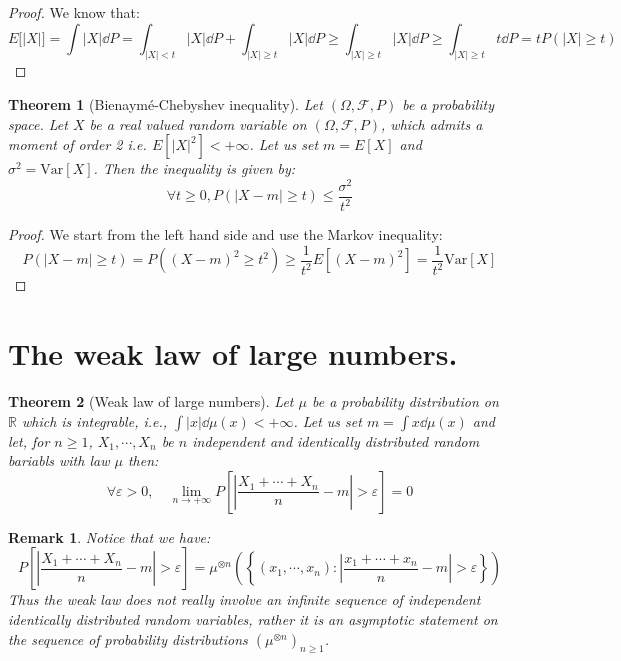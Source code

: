 \documentclass[10pt,a4paper]{book}
\newtheorem{theorem}{Theorem}[section]
\newtheorem*{remark}{Remark}
\theoremstyle{definition}
\begin{document}
\begin{proof}

We know that:
\[
E\big[|X|\big] = \int |X| \dd P = \int_{|X| < t} |X| \dd P + \int_{|X| \geq t} |X| \dd P \geq \int_{|X| \geq t} |X| \dd P \geq \int_{|X| \geq t} t \dd P = t P(|X| \geq t)
\]

\end{proof}

\begin{theorem}[Bienaymé-Chebyshev inequality]
Let $(\Omega, \mathcal{F}, P)$ be a probability space. Let $X$ be a real valued random variable on $(\Omega, \mathcal{F}, P)$, which admits a moment of order 2 i.e. $E[|X|^2] < +\infty$. Let us set $m = E[X]$ and $\sigma^2 = \text{Var}[X]$. Then the inequality is given by:
\[
\forall t \geq 0, P(|X - m| \geq t) \leq \frac{\sigma^2}{t^2}
\]
\end{theorem}

\begin{proof}
We start from the left hand side and use the Markov inequality:
\[
P(|X - m| \geq t) = P\left( (X - m)^2 \geq t^2 \right) \geq \frac{1}{t^2} E\left[ (X - m)^2 \right] = \frac{1}{t^2} \text{Var}[X]
\]
\end{proof}

\section{The weak law of large numbers.}

\begin{theorem}[Weak law of large numbers]
Let $\mu$ be a probability distribution on $\mathbb{R}$ which is integrable, i.e., $\int |x| \dd \mu(x) < +\infty$. Let us set $m = \int x \dd \mu(x)$ and let, for $n \geq 1$, $X_1, \cdots, X_n$ be $n$ independent and identically distributed random bariabls with law $\mu$ then:
\[
\forall \varepsilon > 0, \quad \lim_{n \to +\infty} P\left[ \left|\frac{X_1 + \cdots + X_n}{n} - m \right| > \varepsilon \right] = 0
\]
\end{theorem}

\begin{remark}
Notice that we have:
\[
P\left[ \left|\frac{X_1 + \cdots + X_n}{n} - m \right| > \varepsilon \right] = \mu^{\otimes n} \left( \left\{ \left( x_1, \cdots, x_n \right) : \left| \frac{x_1 + \cdots + x_n}{n} - m \right| > \varepsilon \right\} \right)
\]
Thus the weak law does not really involve an infinite sequence of independent identically distributed random variables, rather it is an asymptotic statement on the sequence of probability distributions $(\mu^{\otimes n})_{n \geq 1}$. 
\end{remark}
\end{document}
